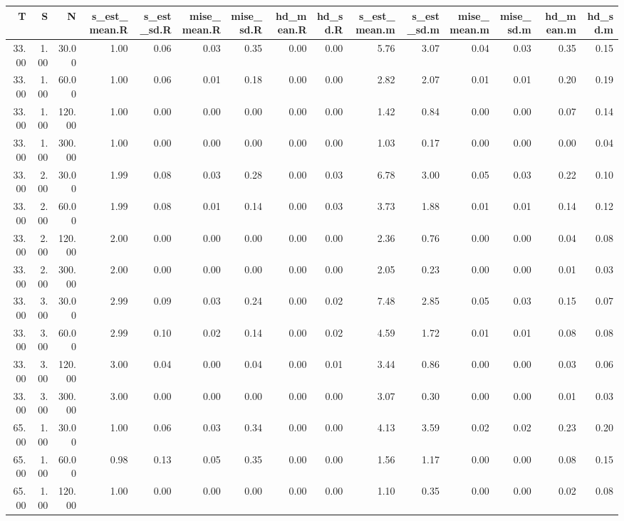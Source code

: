 \begin{table}[ht]
\centering
\begin{tabular}{rrrrrrrrrrrrrrr}
  \hline
T & S & N & s\_est\_mean.R & s\_est\_sd.R & mise\_mean.R & mise\_sd.R & hd\_mean.R & hd\_sd.R & s\_est\_mean.m & s\_est\_sd.m & mise\_mean.m & mise\_sd.m & hd\_mean.m & hd\_sd.m \\ 
  \hline
33.00 & 1.00 & 30.00 & 1.00 & 0.06 & 0.03 & 0.35 & 0.00 & 0.00 & 5.76 & 3.07 & 0.04 & 0.03 & 0.35 & 0.15 \\ 
  33.00 & 1.00 & 60.00 & 1.00 & 0.06 & 0.01 & 0.18 & 0.00 & 0.00 & 2.82 & 2.07 & 0.01 & 0.01 & 0.20 & 0.19 \\ 
  33.00 & 1.00 & 120.00 & 1.00 & 0.00 & 0.00 & 0.00 & 0.00 & 0.00 & 1.42 & 0.84 & 0.00 & 0.00 & 0.07 & 0.14 \\ 
  33.00 & 1.00 & 300.00 & 1.00 & 0.00 & 0.00 & 0.00 & 0.00 & 0.00 & 1.03 & 0.17 & 0.00 & 0.00 & 0.00 & 0.04 \\ 
  33.00 & 2.00 & 30.00 & 1.99 & 0.08 & 0.03 & 0.28 & 0.00 & 0.03 & 6.78 & 3.00 & 0.05 & 0.03 & 0.22 & 0.10 \\ 
  33.00 & 2.00 & 60.00 & 1.99 & 0.08 & 0.01 & 0.14 & 0.00 & 0.03 & 3.73 & 1.88 & 0.01 & 0.01 & 0.14 & 0.12 \\ 
  33.00 & 2.00 & 120.00 & 2.00 & 0.00 & 0.00 & 0.00 & 0.00 & 0.00 & 2.36 & 0.76 & 0.00 & 0.00 & 0.04 & 0.08 \\ 
  33.00 & 2.00 & 300.00 & 2.00 & 0.00 & 0.00 & 0.00 & 0.00 & 0.00 & 2.05 & 0.23 & 0.00 & 0.00 & 0.01 & 0.03 \\ 
  33.00 & 3.00 & 30.00 & 2.99 & 0.09 & 0.03 & 0.24 & 0.00 & 0.02 & 7.48 & 2.85 & 0.05 & 0.03 & 0.15 & 0.07 \\ 
  33.00 & 3.00 & 60.00 & 2.99 & 0.10 & 0.02 & 0.14 & 0.00 & 0.02 & 4.59 & 1.72 & 0.01 & 0.01 & 0.08 & 0.08 \\ 
  33.00 & 3.00 & 120.00 & 3.00 & 0.04 & 0.00 & 0.04 & 0.00 & 0.01 & 3.44 & 0.86 & 0.00 & 0.00 & 0.03 & 0.06 \\ 
  33.00 & 3.00 & 300.00 & 3.00 & 0.00 & 0.00 & 0.00 & 0.00 & 0.00 & 3.07 & 0.30 & 0.00 & 0.00 & 0.01 & 0.03 \\ 
  65.00 & 1.00 & 30.00 & 1.00 & 0.06 & 0.03 & 0.34 & 0.00 & 0.00 & 4.13 & 3.59 & 0.02 & 0.02 & 0.23 & 0.20 \\ 
  65.00 & 1.00 & 60.00 & 0.98 & 0.13 & 0.05 & 0.35 & 0.00 & 0.00 & 1.56 & 1.17 & 0.00 & 0.00 & 0.08 & 0.15 \\ 
  65.00 & 1.00 & 120.00 & 1.00 & 0.00 & 0.00 & 0.00 & 0.00 & 0.00 & 1.10 & 0.35 & 0.00 & 0.00 & 0.02 & 0.08 \\ 

\end{tabular}
\end{table}
